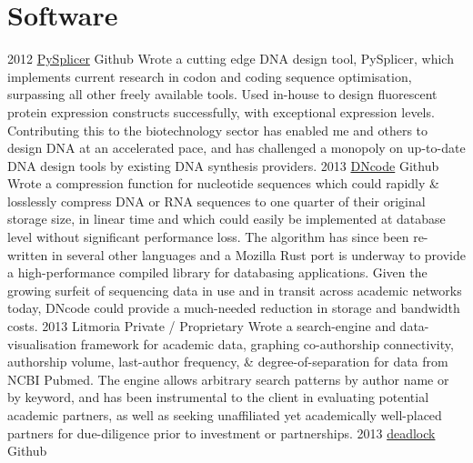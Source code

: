\documentclass[]{friggeri-cv} %
\begin{document}
\pagebreak
\section{Software}

\begin{entrylist}
\entry
{2012}
{\href{https://github.com/cathalgarvey/pysplicer}{PySplicer}}
{Github}
{Wrote a cutting edge DNA design tool, PySplicer, which implements current research
in codon and coding sequence optimisation, surpassing all other freely available tools.
Used in-house to design fluorescent protein expression constructs successfully, 
with exceptional expression levels. Contributing this to the biotechnology sector
has enabled me and others to design DNA at an accelerated pace, and has challenged a
monopoly on up-to-date DNA design tools by existing DNA synthesis providers.
}
\entry
{2013}
{\href{https://github.com/cathalgarvey/dncode}{DNcode}}
{Github}
{Wrote a compression function for nucleotide sequences which could rapidly \& 
losslessly compress DNA or RNA sequences to one quarter of their original storage 
size, in linear time and which could easily be implemented at database level without 
significant performance loss. The algorithm has since been re-written in several other
languages and a Mozilla Rust port is underway to provide a high-performance compiled
library for databasing applications. Given the growing surfeit of sequencing data in use and
in transit across academic networks today, DNcode could provide a much-needed reduction
in storage and bandwidth costs.
}
\entry
{2013}
{Litmoria}
{Private / Proprietary}
{Wrote a search-engine and data-visualisation framework for academic data, graphing
co-authorship connectivity, authorship volume, last-author frequency, \& degree-of-separation
for data from NCBI Pubmed. The engine allows arbitrary search patterns by author name
or by keyword, and has been instrumental to the client in evaluating potential academic
partners, as well as seeking unaffiliated yet academically well-placed partners for
due-diligence prior to investment or partnerships.
}
\entry
{2013}
{\href{https://github.com/cathalgarvey/deadlock}{deadlock}}
{Github}

\end{entrylist}
\end{document}
